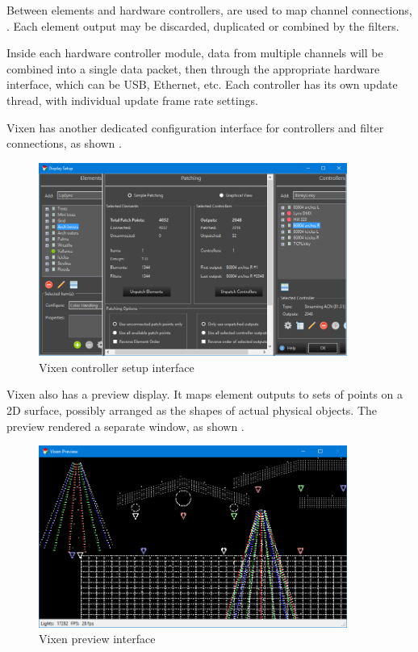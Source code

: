Between elements and hardware controllers,  are used to map  channel connections, . Each element output may be discarded, duplicated or combined by the filters.

Inside each hardware controller module, data from multiple channels will be combined into a single data packet, then  through the appropriate hardware interface, which can be USB, Ethernet, etc. Each controller has its own update thread, with individual update frame rate settings.

Vixen has another dedicated configuration interface for controllers and filter connections, as shown  .

\begin{figure}[!t]
  \centering
  \includegraphics[width=0.9\textwidth]{Figs//vixen_setup.png}
  \caption{\footnotesize Vixen controller setup interface}
  \label{fig:vixen-setup}
\end{figure}

Vixen also has a preview display. It maps element outputs to sets of points on a 2D surface, possibly arranged as the shapes of actual physical objects. The preview  rendered  a separate window, as shown  .

\begin{figure}[!t]
  \centering
  \includegraphics[width=0.9\textwidth]{Figs//vixen_preview.png}
  \caption{\footnotesize Vixen preview interface}
  \label{fig:vixen-preview}
\end{figure}

